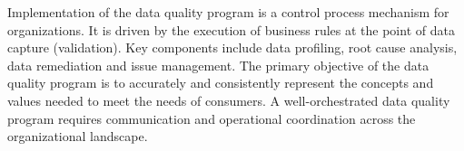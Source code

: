 %
%
Implementation of the data quality program is a control process mechanism for organizations.
It is driven by the execution of business rules at the point of data capture (validation).
Key components include data profiling, root cause analysis, data remediation and issue management.
The primary objective of the data quality program is to accurately and consistently represent the concepts and
values needed to meet the needs of consumers.
A well-orchestrated data quality program requires communication and operational coordination across the
organizational landscape.

